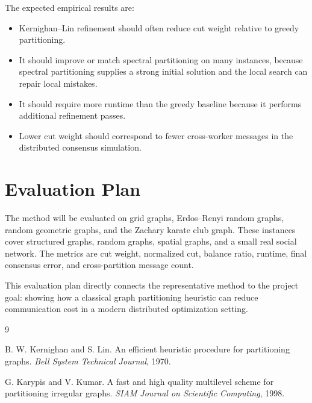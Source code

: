 \documentclass[11pt]{article}
\begin{document}
The expected empirical results are:
\begin{itemize}
    \item Kernighan--Lin refinement should often reduce cut weight relative to
    greedy partitioning.
    \item It should improve or match spectral partitioning on many instances,
    because spectral partitioning supplies a strong initial solution and the
    local search can repair local mistakes.
    \item It should require more runtime than the greedy baseline because it
    performs additional refinement passes.
    \item Lower cut weight should correspond to fewer cross-worker messages in
    the distributed consensus simulation.
\end{itemize}

\section{Evaluation Plan}

The method will be evaluated on grid graphs, Erdos--Renyi random graphs,
random geometric graphs, and the Zachary karate club graph. These instances
cover structured graphs, random graphs, spatial graphs, and a small real social
network. The metrics are cut weight, normalized cut, balance ratio, runtime,
final consensus error, and cross-partition message count.

This evaluation plan directly connects the representative method to the
project goal: showing how a classical graph partitioning heuristic can reduce
communication cost in a modern distributed optimization setting.

\begin{thebibliography}{9}

B. W. Kernighan and S. Lin.
\newblock An efficient heuristic procedure for partitioning graphs.
\newblock \emph{Bell System Technical Journal}, 1970.

G. Karypis and V. Kumar.
\newblock A fast and high quality multilevel scheme for partitioning irregular graphs.
\newblock \emph{SIAM Journal on Scientific Computing}, 1998.

\end{thebibliography}
\end{document}
